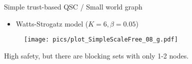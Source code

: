 \documentclass{beamer}
\newcommand{\redalert}[1]{\textcolor{hured}{#1}}
\newcommand{\arrow}[1][]{$\xrightarrow{\text{#1}}$ }
\begin{document}

\begin{frame}{Simple trust-based QSC / Small world graph}
  \begin{itemize}
    \item Watts-Strogatz model ($K = 6, \beta = 0.05$)
  \end{itemize}
  \begin{figure}[htpb]
    \centering
    \texttt{[image: pics/plot\_SimpleScaleFree\_08\_g.pdf]}
  \end{figure}
  High safety,
  but there are \redalert{blocking sets} with only \redalert{1-2} nodes.
\end{frame}
\end{document}
